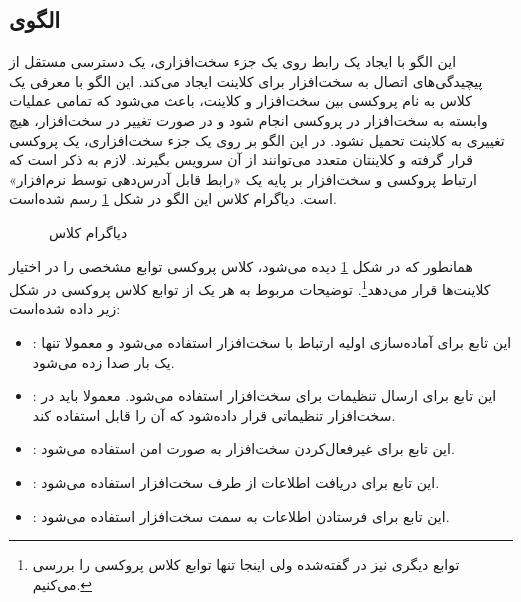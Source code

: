 \subsection{الگوی }
\label{HWProxySec}
\begin{RTL}
این الگو با ایجاد یک رابط روی یک جزء سخت‌افزاری، یک دسترسی
مستقل از پیچیدگی‌های اتصال به سخت‌افزار برای کلاینت ایجاد می‌کند.
این الگو با معرفی یک کلاس به نام پروکسی بین سخت‌افزار و کلاینت،
باعث می‌شود که تمامی عملیات وابسته به سخت‌افزار در پروکسی انجام شود
و در صورت تغییر در سخت‌افزار، هیچ تغییری به کلاینت تحمیل نشود.
در این الگو بر روی یک جزء سخت‌افزاری، یک پروکسی قرار گرفته و
کلاینتان متعدد می‌توانند از آن سرویس بگیرند. لازم به ذکر است که ارتباط پروکسی
و سخت‌افزار بر پایه یک «رابط قابل آدرس‌دهی توسط نرم‌افزار» است. 
دیاگرام کلاس این الگو در شکل \ref{HWProxyClassDiag} رسم شده‌است.
\end{RTL}
\begin{figure}[h!]
\centering
{}
\caption{دیاگرام کلاس }
\label{HWProxyClassDiag}
\end{figure}
\begin{RTL}
همانطور که در شکل \ref{HWProxyClassDiag} دیده می‌شود، کلاس پروکسی توابع
مشخصی را در اختیار کلاینت‌ها قرار می‌دهد\footnote{توابع دیگری نیز در \cite{ref1}
گفته‌شده ولی اینجا تنها توابع  کلاس پروکسی را بررسی می‌کنیم.}.
توضیحات مربوط به هر یک از توابع کلاس پروکسی در شکل زیر داده شده‌است:
\begin{itemize}
  \item {}:
  این تابع برای آماده‌سازی اولیه ارتباط با سخت‌افزار استفاده می‌شود و معمولا تنها یک بار
  صدا زده می‌شود.
  \item {}:
  این تابع برای ارسال تنظیمات برای سخت‌افزار استفاده می‌شود. معمولا باید در سخت‌افزار
  تنظیماتی قرار داده‌شود که آن را قابل استفاده کند.
  \item {}:
  این تابع برای غیرفعال‌کردن سخت‌افزار به صورت امن استفاده می‌شود.
  \item {}:
  این تابع برای دریافت اطلاعات از طرف سخت‌افزار استفاده می‌شود.
  \item {}:
  این تابع برای فرستادن اطلاعات به سمت سخت‌افزار استفاده می‌شود.
\end{itemize}
\end{RTL}
